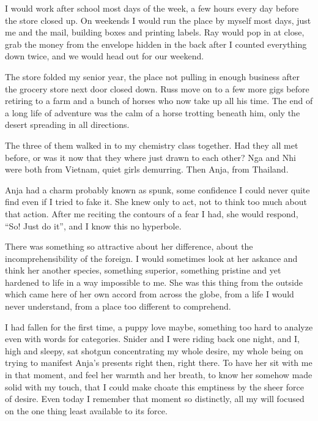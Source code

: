\documentclass[ebook, 10pt, openright, onecolumn]{memoir}
\newcommand*\td[1]{
  \todo[inline]{
     #1 
  }
}
\newcommand*\finish{\td{ ----- Finish this section -----}}
\begin{document}
I would work after school most days of the week, a few hours every day before
the store closed up.  On weekends I would run the place by myself most days,
just me and the mail, building boxes and printing labels. Ray would pop in at
close, grab the money from the envelope hidden in the back after I counted
everything down twice, and we would head out for our weekend.

The store folded my senior year, the place not pulling in enough business after
the grocery store next door closed down.  Russ move on to a few more gigs before
retiring to a farm and a bunch of horses who now take up all his time.  The end
of a long life of adventure was the calm of a horse trotting beneath him, only
the desert spreading in all directions.

\finish

The three of them walked in to my chemistry class together.  Had they all met
before, or was it now that they where just drawn to each other? Nga and Nhi were
both from Vietnam, quiet girls demurring. Then Anja, from Thailand.

Anja had a charm probably known as spunk, some confidence I could never quite
find even if I tried to fake it. She knew only to act, not to think too much
about that action.  After me reciting the contours of a fear I had, she would
respond, ``So! Just do it'', and I know this no hyperbole.

There was something so attractive about her difference, about the
incomprehensibility of the foreign.  I would sometimes look at her askance and
think her another species, something superior, something pristine and yet
hardened to life in a way impossible to me.  She was this thing from the outside
which came here of her own accord from across the globe, from a life I would
never understand, from a place too different to comprehend.   

\finish

I had fallen for the first time, a puppy love maybe, something too hard to
analyze even with words for categories.  Snider and I were riding back one
night, and I, high and sleepy, sat shotgun concentrating my whole desire, my
whole being on trying to manifest Anja's presents right then, right there.  To
have her sit with me in that moment, and feel her warmth and her breath, to know
her somehow made solid with my touch, that I could make choate this emptiness by
the sheer force of desire.  Even today I remember that moment so distinctly, all
my will focused on the one thing least available to its force.
\end{document}
